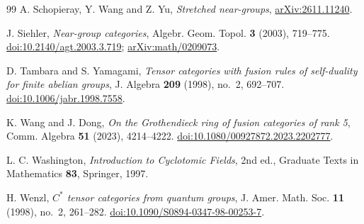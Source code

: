 \documentclass[11pt,a4paper]{article}
\numberwithin{equation}{section}
\begin{document}
\begin{thebibliography}{99}
 A. Schopieray, Y. Wang and Z. Yu, \emph{Stretched near-groups}, \href{https://arxiv.org/abs/2611.11240}{arXiv:2611.11240}.

J. Siehler, \emph{Near-group categories},
Algebr. Geom. Topol. \textbf{3} (2003), 719--775.
\href{https://doi.org/10.2140/agt.2003.3.719}{doi:10.2140/agt.2003.3.719};
\href{https://arxiv.org/abs/math/0209073}{arXiv:math/0209073}.

D. Tambara and S. Yamagami,
\emph{Tensor categories with fusion rules of self-duality for finite
abelian groups}, J. Algebra \textbf{209} (1998), no.~2, 692--707.
\href{https://doi.org/10.1006/jabr.1998.7558}{doi:10.1006/jabr.1998.7558}.

 K. Wang and J. Dong,
\emph{On the Grothendieck ring of fusion categories of rank 5}, Comm. Algebra
\textbf{51} (2023), 4214--4222. \href{https://doi.org/10.1080/00927872.2023.2202777}{doi:10.1080/00927872.2023.2202777}.

 L. C. Washington,
\emph{Introduction to Cyclotomic Fields}, 2nd ed., Graduate Texts in Mathematics \textbf{83}, Springer, 1997.

 H. Wenzl,
\emph{$C^*$ tensor categories from quantum groups},
J. Amer. Math. Soc. \textbf{11} (1998), no.~2, 261--282.
\href{https://doi.org/10.1090/S0894-0347-98-00253-7}{doi:10.1090/S0894-0347-98-00253-7}.
\end{thebibliography}
\end{document}
